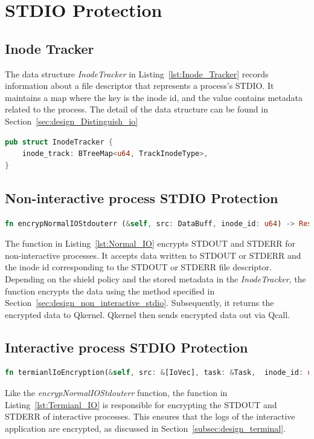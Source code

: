 \section{STDIO Protection}
\label{sec:impl_STDIO}

\subsection{Inode Tracker}
The data structure \emph{InodeTracker} in Listing~\ref{lst:Inode_Tracker} records information about a file descriptor that represents a process’s STDIO. It maintains a map where the key is the inode id, and the value contains metadata related to the process. 
The detail of the data structure can be found in Section~\ref{sec:design_Distinguish_io}


\begin{lstlisting}[language=rust, caption= API of Inode Tracker, label={lst:Inode_Tracker}]
pub struct InodeTracker {
    inode_track: BTreeMap<u64, TrackInodeType>,
} 
\end{lstlisting}

\subsection{Non-interactive process STDIO Protection}
\begin{lstlisting}[language=rust, caption= API of normal IO shield, label={lst:Normal_IO}]
fn encrypNormalIOStdouterr (&self, src: DataBuff, inode_id: u64) -> Result<DataBuff>
\end{lstlisting}
The function in Listing~\ref{lst:Normal_IO} encrypts STDOUT and STDERR for non-interactive processes. It accepts data written to STDOUT or STDERR and the inode id corresponding to the STDOUT or STDERR file descriptor. Depending on the shield policy and the stored metadata in the \emph{InodeTracker}, 
the function encrypts the data using the method specified in Section~\ref{sec:design_non_interactive_stdio}. Subsequently, it returns the encrypted data to Qkernel. Qkernel then sends encrypted data out via Qcall.



\subsection{Interactive process STDIO Protection}
\begin{lstlisting}[language=rust, caption= API of system call interceptor, label={lst:Termianl_IO}]
fn termianlIoEncryption(&self, src: &[IoVec], task: &Task,  inode_id: u64) -> Result<(Vec::<IoVec>)
\end{lstlisting}
Like the \emph{encrypNormalIOStdouterr} function, the function in Listing~\ref{lst:Termianl_IO} is responsible for encrypting the STDOUT and STDERR of interactive processes. This ensures that the logs of the interactive application are encrypted, as discussed in Section~\ref{subsec:design_terminal}.


